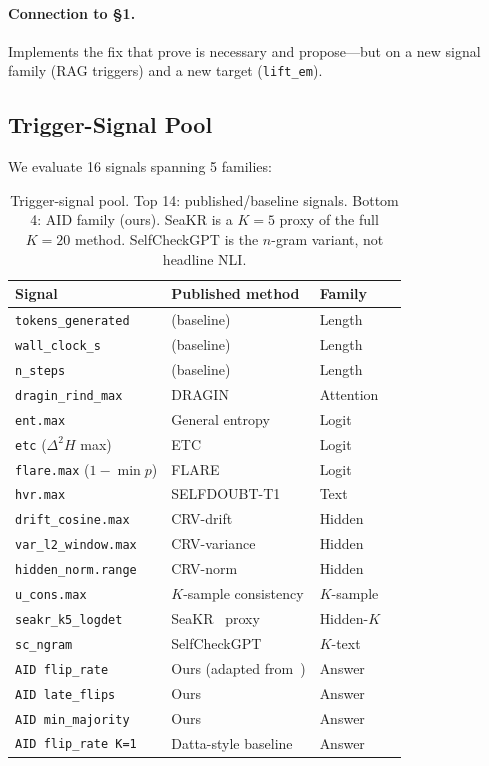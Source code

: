 \documentclass[11pt]{article}
\begin{document}
\paragraph{Connection to \S1.} Implements the fix that
\cite{Santilli_RevisitingUQEvaluationLengthBias} prove is necessary
and \cite{Vashurin_UncertaintyLineLengthInvariant} propose---but
on a new signal family (RAG triggers) and a new target
(\texttt{lift\_em}).


\subsection{Trigger-Signal Pool}

We evaluate 16 signals spanning 5 families:

\begin{table}[h]
\centering\small
\begin{tabular}{@{}llll@{}}
\toprule
\textbf{Signal} & \textbf{Published method} & \textbf{Family} \\
\midrule
\texttt{tokens\_generated} & (baseline) & Length \\
\texttt{wall\_clock\_s} & (baseline) & Length \\
\texttt{n\_steps} & (baseline) & Length \\
\texttt{dragin\_rind\_max} & DRAGIN~\citep{Su_DRAGIN} & Attention \\
\texttt{ent.max} & General entropy & Logit \\
\texttt{etc} ($\Delta^2 H$ max) & ETC~\citep{Li_ETC} & Logit \\
\texttt{flare.max} ($1{-}\min p$) & FLARE~\citep{Jiang_FLARE} & Logit \\
\texttt{hvr.max} & SELFDOUBT-T1 & Text \\
\texttt{drift\_cosine.max} & CRV-drift & Hidden \\
\texttt{var\_l2\_window.max} & CRV-variance & Hidden \\
\texttt{hidden\_norm.range} & CRV-norm & Hidden \\
\texttt{u\_cons.max} & $K$-sample consistency & $K$-sample \\
\texttt{seakr\_k5\_logdet} & SeaKR~\citep{Yao_SeaKR} proxy & Hidden-$K$ \\
\texttt{sc\_ngram} & SelfCheckGPT~\citep{Manakul_SelfCheckGPT} & $K$-text \\
\midrule
\texttt{AID flip\_rate} & Ours (adapted from~\citep{Datta_DecideEarlyExplainLater}) & Answer \\
\texttt{AID late\_flips} & Ours & Answer \\
\texttt{AID min\_majority} & Ours & Answer \\
\texttt{AID flip\_rate K=1} & Datta-style baseline & Answer \\
\bottomrule
\end{tabular}
\caption{Trigger-signal pool. Top 14: published/baseline signals.
Bottom 4: AID family (ours). SeaKR is a $K{=}5$ proxy of the full
$K{=}20$ method. SelfCheckGPT is the $n$-gram variant, not
headline NLI.}
\label{tab:pool}
\end{table}
\end{document}
